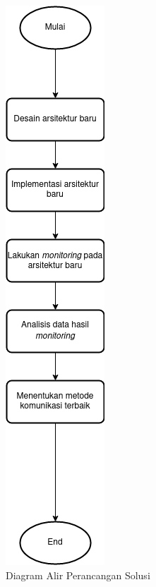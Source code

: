 \begin{figure}[ht]
	\centering
	\includegraphics[height=0.6\textheight]{resources/chapter-3/flowchart-perancangan.png}
	\caption{Diagram Alir Perancangan Solusi}
	\label{chapter-3-perancangan}
\end{figure}